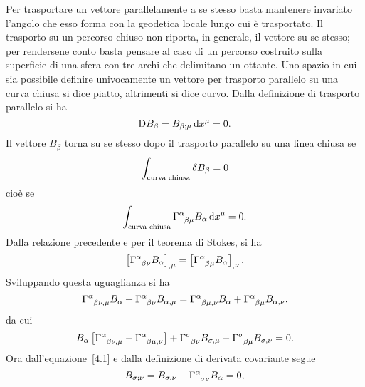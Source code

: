 Per trasportare un vettore parallelamente a se stesso basta mantenere invariato
l'angolo che esso forma con la geodetica locale lungo cui è trasportato.  Il
trasporto su un percorso chiuso non riporta, in generale, il vettore su se
stesso; per rendersene conto basta pensare al caso di un percorso costruito
sulla superficie di una sfera con tre archi che delimitano un ottante.  Uno
spazio in cui sia possibile definire univocamente un vettore per trasporto
parallelo su una curva chiusa si dice piatto, altrimenti si dice curvo.  Dalla
definizione di trasporto parallelo si ha
\begin{equation}
  \mathop{}\!\mathrm{D} B_{\beta} = B_{\beta;\mu} \mathop{}\!\mathrm{d} x^{\mu}=0.
  \label{4.1}
\end{equation}
Il vettore $B_{\beta}$ torna su se stesso dopo il trasporto parallelo su una
linea chiusa se
\begin{equation}
  \label{4.24}
  \int_{\textup{curva chiusa}} \delta B_{\beta}=0
\end{equation}
cioè se
\begin{equation}
  \int_{\textup{curva chiusa}} \tensor{\Gamma}{^{\alpha}_{\beta \mu}} B_{\alpha}
  \dd x^{\mu} =0.
\end{equation}
Dalla relazione precedente e per il teorema di Stokes, si ha
\begin{equation}
  \left[\tensor{\Gamma}{^{\alpha}_{\beta \nu}} B_{\alpha} \right]_{,\mu} =
  \left[\tensor{\Gamma}{^{\alpha}_{\beta \mu}} B_{\alpha} \right]_{,\nu}.
\end{equation}
Sviluppando questa uguaglianza si ha
\begin{equation}
  \tensor{\Gamma}{^{\alpha}_{\beta \nu ,\mu}} B_{\alpha} +
  \tensor{\Gamma}{^{\alpha}_{\beta \nu}} B_{\alpha ,\mu} =
  \tensor{\Gamma}{^{\alpha}_{\beta \mu, \nu}} B_{\alpha} +
  \tensor{\Gamma}{^{\alpha}_{\beta \mu}} B_{\alpha , \nu},
\end{equation}
da cui
\begin{equation}
  \label{4.5}
  B_{\alpha} \left[ \tensor{\Gamma}{^{\alpha}_{\beta \nu , \mu}}
    -\tensor{\Gamma}{^{\alpha}_{\beta \mu ,\nu}} \right] +
  \tensor{\Gamma}{^{\sigma}_{\beta \nu}} B_{\sigma,\mu} -
  \tensor{\Gamma}{^{\sigma}_{\beta \mu}} B_{\sigma,\nu} = 0.
\end{equation}
Ora dall'equazione~\eqref{4.1} e dalla definizione di derivata covariante segue
\begin{equation}
  B_{\sigma;\nu} = B_{\sigma,\nu}-\tensor{\Gamma}{^{\alpha}_{\sigma \nu}}
  B_{\alpha} = 0,
\end{equation}
